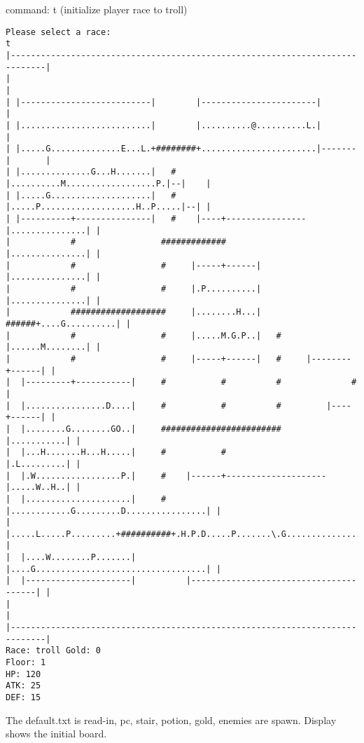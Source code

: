 \documentclass[11pt]{article}
\theoremstyle{plain}
\begin{document}
command: t	(initialize player race to troll)
\begin{Verbatim}[fontsize=\scriptsize]
Please select a race:
t
|-----------------------------------------------------------------------------|
|                                                                             |
| |--------------------------|        |-----------------------|               |
| |..........................|        |..........@..........L.|               |
| |.....G..............E...L.+########+.......................|-------|       |
| |..............G...H.......|   #    |..........M..................P.|--|    |
| |.....G....................|   #    |.....P...................H..P.....|--| |
| |----------+---------------|   #    |----+----------------|...............| |
|            #                 #############                |...............| |
|            #                 #     |-----+------|         |...............| |
|            #                 #     |.P..........|         |...............| |
|            ###################     |........H...|   ######+....G..........| |
|            #                 #     |.....M.G.P..|   #     |......M........| |
|            #                 #     |-----+------|   #     |--------+------| |
|  |---------+-----------|     #           #          #              #        |
|  |................D....|     #           #          #         |----+------| |
|  |........G........GO..|     ########################         |...........| |
|  |...H.......H...H.....|     #           #                    |.L.........| |
|  |.W.................P.|     #    |------+--------------------|.....W..H..| |
|  |.....................|     #    |............G.........D................| |
|  |.....L.....P.........+##########+.H.P.D.....P.......\.G.................| |
|  |....W........P.......|          |....G..................................| |
|  |---------------------|          |---------------------------------------| |
|                                                                             |
|-----------------------------------------------------------------------------|
Race: troll Gold: 0                                                    Floor: 1
HP: 120
ATK: 25
DEF: 15
\end{Verbatim}

The default.txt is read-in, pc, stair, potion, gold, enemies are spawn.
Display shows the initial board.
\end{document}
